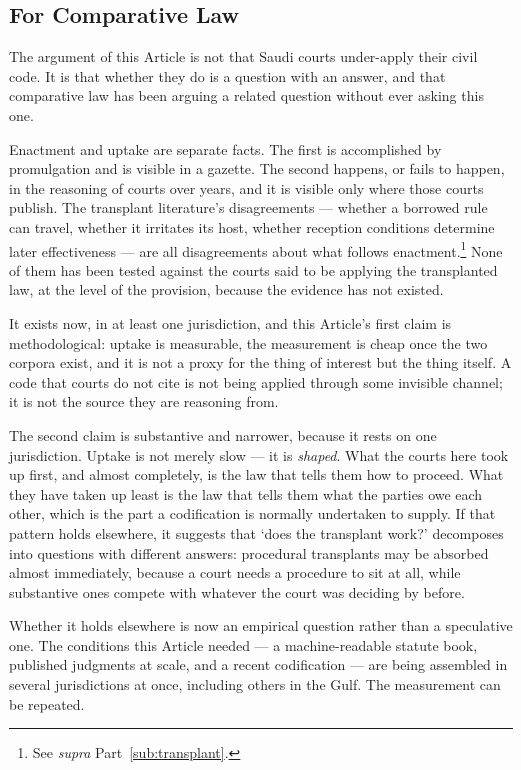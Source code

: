 \documentclass[12pt]{article}
\begin{document}
\subsection{For Comparative Law}

The argument of this Article is not that Saudi courts under-apply their civil
code. It is that whether they do is a question with an answer, and that
comparative law has been arguing a related question without ever asking this
one.

Enactment and uptake are separate facts. The first is accomplished by
promulgation and is visible in a gazette. The second happens, or fails to
happen, in the reasoning of courts over years, and it is visible only where
those courts publish. The transplant literature's disagreements --- whether a
borrowed rule can travel, whether it irritates its host, whether reception
conditions determine later effectiveness --- are all disagreements about what
follows enactment.\footnote{See \emph{supra} Part~\ref{sub:transplant}.} None of them has been
tested against the courts said to be applying the transplanted law, at the
level of the provision, because the evidence has not existed.

It exists now, in at least one jurisdiction, and this Article's first claim is
methodological: uptake is measurable, the measurement is cheap once the two
corpora exist, and it is not a proxy for the thing of interest but the thing
itself. A code that courts do not cite is not being applied through some
invisible channel; it is not the source they are reasoning from.

The second claim is substantive and narrower, because it rests on one
jurisdiction. Uptake is not merely slow --- it is \emph{shaped}. What the
courts here took up first, and almost completely, is the law that tells them
how to proceed. What they have taken up least is the law that tells them what
the parties owe each other, which is the part a codification is normally
undertaken to supply. If that pattern holds elsewhere, it suggests that
`does the transplant work?' decomposes into questions with different answers:
procedural transplants may be absorbed almost immediately, because a court
needs a procedure to sit at all, while substantive ones compete with whatever
the court was deciding by before.

Whether it holds elsewhere is now an empirical question rather than a
speculative one. The conditions this Article needed --- a machine-readable
statute book, published judgments at scale, and a recent codification --- are
being assembled in several jurisdictions at once, including others in the
Gulf. The measurement can be repeated.
\end{document}

